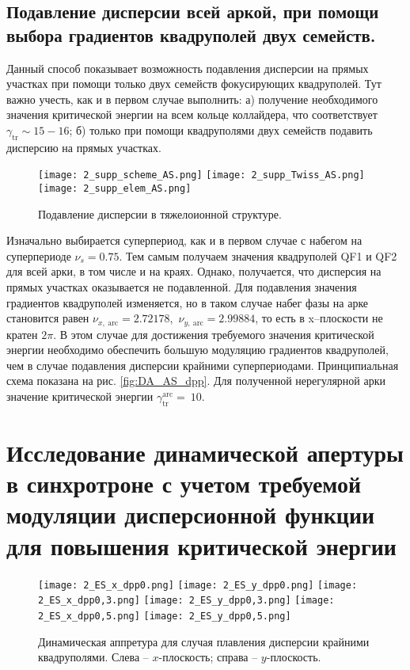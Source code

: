 \subsection{Подавление дисперсии всей аркой, при помощи выбора градиентов квадруполей двух семейств.}\label{subsec:transition_variation/methods/disp_supperssion_AS}	

Данный способ показывает возможность подавления дисперсии на прямых участках при помощи только двух семейств фокусирующих квадруполей. Тут важно учесть, как и в первом случае выполнить:
	а) получение необходимого значения критической энергии на всем кольце коллайдера, что соответствует $\gamma_{\text{tr}}\sim15-16$;
	б) только при помощи квадруполями двух семейств подавить дисперсию на прямых участках.

\begin{figure} [h!]
	\center
	\texttt{[image: 2\_supp\_scheme\_AS.png]}
	\texttt{[image: 2\_supp\_Twiss\_AS.png]}
	\texttt{[image: 2\_supp\_elem\_AS.png]}
	\caption{Подавление дисперсии в тяжелоионной структуре.}
	\label{fig:2_disp_supp_AS}
\end{figure}
	
\par Изначально выбирается суперпериод, как и в первом случае с набегом на суперпериоде $\nu_s=0.75$. Тем самым получаем значения квадруполей QF1 и QF2 для всей арки, в том числе и на краях. Однако, получается, что дисперсия на прямых участках оказывается не подавленной. Для подавления значения градиентов квадруполей изменяется, но в таком случае набег фазы на арке становится равен $\nu_{x,\ \text{arc}}=2.72178$,\ $\nu_{y,\ \text{arc}}=2.99884$, то есть в x–плоскости не кратен $2\pi$. В этом случае для достижения требуемого значения критической энергии необходимо обеспечить большую модуляцию градиентов квадруполей, чем в случае подавления дисперсии крайними суперпериодами. Принципиальная схема показана на рис. \ref{fig:DA_AS_dpp}. Для полученной нерегулярной арки значение критической энергии $\gamma_{\text{tr}}^{\text{arc}}=\ 10$.

\section{Исследование динамической апертуры в синхротроне с учетом требуемой модуляции дисперсионной функции для повышения критической энергии}

\begin{figure} [h!]
	\center
	\texttt{[image: 2\_ES\_x\_dpp0.png]}
	\texttt{[image: 2\_ES\_y\_dpp0.png]}
	\texttt{[image: 2\_ES\_x\_dpp0,3.png]}
	\texttt{[image: 2\_ES\_y\_dpp0,3.png]}
	\texttt{[image: 2\_ES\_x\_dpp0,5.png]}
	\texttt{[image: 2\_ES\_y\_dpp0,5.png]}
	\caption{Динамическая аппретура для случая плавления дисперсии крайними квадруполями. 
		Слева – $x$-плоскость; справа – $y$-плоскость.}
	\label{fig:DA_ES_dpp}
\end{figure}	

